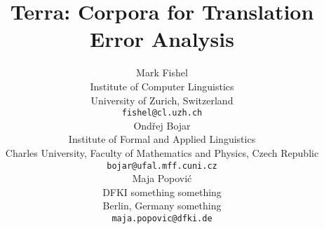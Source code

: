 \documentclass[11pt]{article}
\title{Terra: Corpora for Translation Error Analysis}
\author{Mark Fishel \\
  Institute of Computer Linguistics\\
  University of Zurich, Switzerland\\
  {\tt fishel@cl.uzh.ch} \\
  \And
  Ondřej Bojar\\
  Institute of Formal and Applied Linguistics \\
  Charles University, Faculty of Mathematics and Physics, Czech Republic \\
  {\tt bojar@ufal.mff.cuni.cz} \\
  \And
  Maja Popović\\
  DFKI something something\\
  Berlin, Germany something\\
  {\tt maja.popovic@dfki.de}\\
  }
\date{}
\begin{document}
\maketitle
\begin{abstract}
\end{abstract}

%
%
\end{document}
